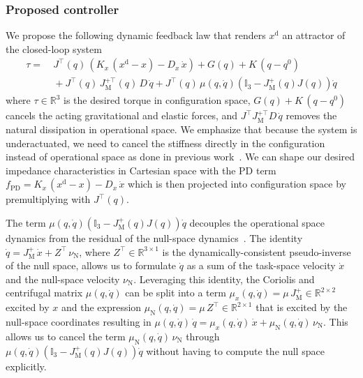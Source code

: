 \subsubsection{Proposed controller}
We propose the following dynamic feedback law that renders $x^\mathrm{d}$ an attractor of the closed-loop system %
\begin{equation}\label{eq:hsacontrol:task_space_impedance_control:cartesian_impedance_controller}
\begin{split}
    \tau =& \: J^\top(q) \, \left (K_x \, (x^\mathrm{d} - x) - D_x \, \dot{x} \right ) + G(q) + K \, (q-q^0)\\
    & \: + J^\top(q) \, J_\mathrm{M}^{+\top}(q) \, D \, \dot{q} + J^\top(q) \, \mu(q,\dot{q}) \left ( \mathbb{I}_3 - J_\mathrm{M}^+(q) J(q) \right )\dot{q}
\end{split}
\end{equation}
where $\tau \in \mathbb{R}^3$ is the desired torque in configuration space, $G(q) + K \, (q-q^0)$ cancels the acting gravitational and elastic forces, and $J^\top J_\mathrm{M}^{+\top} D \, \dot{q}$ removes the natural dissipation in operational space.
We emphasize that because the system is underactuated, we need to cancel the stiffness directly in the configuration instead of operational space as done in previous work~\citep{della2020model}.
We can shape our desired impedance characteristics in Cartesian space with the PD term $f_\mathrm{PD} = K_x \, (x^\mathrm{d} - x) - D_x \, \dot{x} $ which is then projected into configuration space by premultiplying with $J^\top(q)$.

The term $\mu(q,\dot{q}) \left ( \mathbb{I}_3 - J_\mathrm{M}^+(q) J(q) \right )\dot{q}$ decouples the operational space dynamics from the residual of the null-space dynamics~\citep{della2020model}\cite[Ch. 4]{ott2008cartesian}.
The identity $\dot{q} = J_\mathrm{M}^+ \, \dot{x} + Z^\top \, \nu_\mathrm{N}$, where $Z^\top \in \mathbb{R}^{3 \times 1}$ is the dynamically-consistent pseudo-inverse of the null space, allows us to formulate $\dot{q}$ as a sum of the task-space velocity $\dot{x}$ and the null-space velocity $\nu_\mathrm{N}$. Leveraging this identity, the Coriolis and centrifugal matrix $\mu(q,\dot{q})$ can be split into a term $\mu_x(q,\dot{q}) = \mu \, J_\mathrm{M}^+ \in \mathbb{R}^{2 \times 2}$ excited by $x$ and the expression $\mu_\mathrm{N}(q,\dot{q}) = \mu \, Z^\top \in \mathbb{R}^{2 \times 1}$ that is excited by the null-space coordinates resulting in $\mu(q,\dot{q}) \, \dot{q} = \mu_x(q,\dot{q}) \, \dot{x} + \mu_\mathrm{N}(q,\dot{q}) \, \nu_\mathrm{N}$.
This allows us to cancel the term $\mu_\mathrm{N}(q,\dot{q}) \, \nu_\mathrm{N}$ through $\mu(q,\dot{q}) \left ( \mathbb{I}_3 - J_\mathrm{M}^+(q) J(q) \right )\dot{q}$ without having to compute the null space explicitly.


